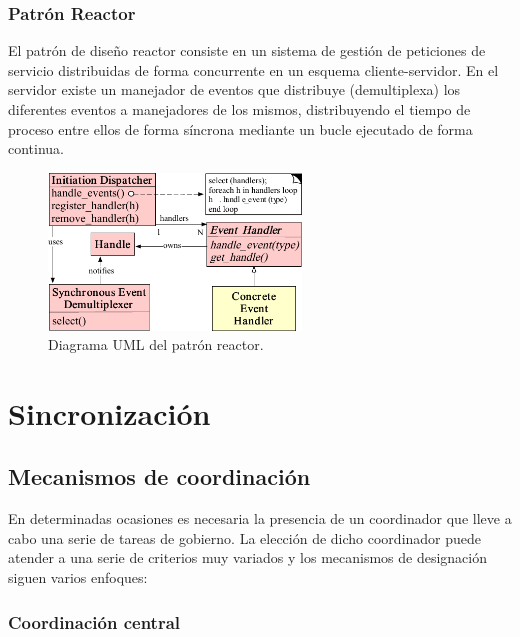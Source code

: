 \subsubsection{Patrón Reactor}

El patrón de diseño reactor\cite{Coplien95reactor} consiste en un sistema de gestión de peticiones de servicio distribuidas de forma concurrente en un esquema cliente-servidor. En el servidor existe un manejador de eventos que distribuye (demultiplexa) los diferentes eventos a manejadores de los mismos, distribuyendo el tiempo de proceso entre ellos de forma síncrona mediante un bucle ejecutado de forma continua.

\begin{figure}[H]
  \centering
  \includegraphics[width=0.6\textwidth]{Chapter2/Figures/reactoruml}
  \caption[Diagrama UML del patrón reactor]{Diagrama UML del patrón reactor\label{Coplien95reactor}.}
  \label{fig:reactoruml}
\end{figure}




\section{Sincronización}

\subsection{Mecanismos de coordinación}

En determinadas ocasiones es necesaria la presencia de un coordinador que lleve a cabo una serie de tareas de gobierno. La elección de dicho coordinador puede atender a una serie de criterios muy variados y los mecanismos de designación siguen varios enfoques:

\subsubsection{Coordinación central}

